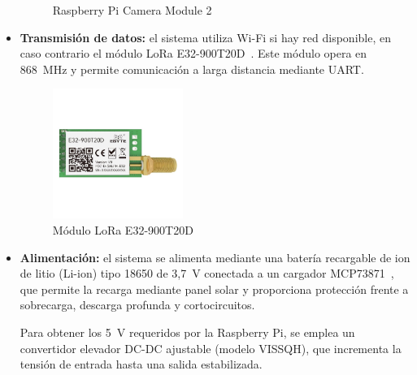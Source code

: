 \begin{itemize}
\begin{figure}[h]
        \caption{Raspberry Pi Camera Module 2}
        \label{fig:rascamv2}
    \end{figure}
    \item \textbf{Transmisión de datos:} el sistema utiliza Wi-Fi si hay red disponible, en caso contrario el módulo LoRa E32-900T20D~\cite{ebyteE32}.
    Este módulo opera en 868~MHz y permite comunicación a larga distancia mediante UART.
    \begin{figure}[h]
        \centering
        \includegraphics[width=0.4\textwidth]{Imagenes/Bitmap/lorae32}
        \caption{Módulo LoRa E32-900T20D}
        \label{fig:lorae32}
    \end{figure}

    \item \textbf{Alimentación:} el sistema se alimenta mediante una batería recargable de ion de litio (Li-ion) tipo 18650 de 3{,}7~V conectada a un cargador MCP73871~\cite{mcp73871Datasheet}, que permite la recarga mediante panel solar y proporciona protección frente a sobrecarga, descarga profunda y cortocircuitos.

    Para obtener los 5~V requeridos por la Raspberry Pi, se emplea un convertidor elevador DC-DC ajustable (modelo VISSQH), que incrementa la tensión de entrada hasta una salida estabilizada.


\end{itemize}
